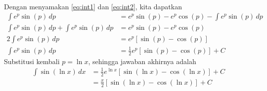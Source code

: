 \documentclass[11pt,openany,a4paper]{article}
\begin{document}
\begin{enumerate}
\begin{align}
        \end{align}
        Dengan menyamakan \eqref{eq:int1} dan \eqref{eq:int2}, kita dapatkan
        \begin{align*}
          \int e^p \sin(p) \, dp &= e^p \sin(p) - e^p \cos(p) - \int e^p \sin(p) \, dp\\
          \int e^p \sin(p) \, dp + \int e^p \sin(p) \, dp &= e^p \sin(p) - e^p \cos(p) \\
          2\int e^p \sin(p) \, dp &= e^p \left[\sin(p) - \cos(p)\right] \\
          \int e^p \sin(p) \, dp &= \frac{1}{2}e^p \left[\sin(p) - \cos(p)\right] + C
        \end{align*}
        Substitusi kembali $p = \ln x$, sehingga jawaban akhirnya adalah
        \begin{align*}
          \int \sin(\ln x) \, dx &= \frac{1}{2}e^{\ln x} \left[\sin(\ln x) - \cos(\ln x)\right] + C \\
          &=\boxed{\frac{x}{2} \left[\sin(\ln x) - \cos(\ln x)\right] + C}
        \end{align*}


\end{enumerate}
\end{document}

